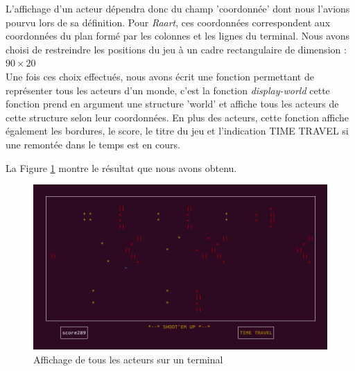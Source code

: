 \documentclass[a4paper,10pt]{article}
\begin{document}
L'affichage d'un acteur dépendra donc du champ 'coordonnée' dont nous l'avions pourvu lors de sa définition. Pour \textit{Raart}, ces coordonnées correspondent aux coordonnées du plan formé par les colonnes et les lignes du terminal. Nous avons choisi de restreindre les positions du jeu à un cadre rectangulaire de dimension : $90 \times 20$ \\
Une fois ces choix effectués, nous avons écrit une fonction permettant de représenter tous les acteurs d'un monde, c'est la fonction \textit{display-world} cette fonction prend en argument une structure 'world' et affiche tous les acteurs de cette structure selon leur coordonnées. En plus des acteurs, cette fonction affiche également les bordures, le score, le titre du jeu et l'indication TIME TRAVEL si une remontée dans le temps est en cours.

La Figure \ref{affterm} montre le résultat que nous avons obtenu.
\newline

\begin{figure}[h]
\begin{center}
    \includegraphics[scale=0.45]{affichage.png}
        \caption{Affichage de tous les acteurs sur un terminal}
    \label{affterm}
\end{center}
\end{figure}
\end{document}
